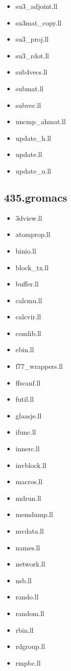 \begin{multicols}{3}
\begin{itemize}
		\item su3\_adjoint.ll
		\item su3mat\_copy.ll
		\item su3\_proj.ll
		\item su3\_rdot.ll
		\item sub4vecs.ll
		\item submat.ll
		\item subvec.ll
		\item uncmp\_ahmat.ll
		\item update\_h.ll
		\item update.ll
		\item update\_u.ll
	\end{itemize}

	\subsection{435.gromacs}
	\begin{itemize}
		\item 3dview.ll
		\item atomprop.ll
		\item binio.ll
		\item block\_tx.ll
		\item buffer.ll
		\item calcmu.ll
		\item calcvir.ll
		\item comlib.ll
		\item ebin.ll
		\item f77\_wrappers.ll
		\item ffscanf.ll
		\item futil.ll
		\item glaasje.ll
		\item ifunc.ll
		\item innerc.ll
		\item invblock.ll
		\item macros.ll
		\item mdrun.ll
		\item memdump.ll
		\item mvdata.ll
		\item names.ll
		\item network.ll
		\item nsb.ll
		\item rando.ll
		\item random.ll
		\item rbin.ll
		\item rdgroup.ll
		\item rmpbc.ll

\end{itemize}
\end{multicols}
